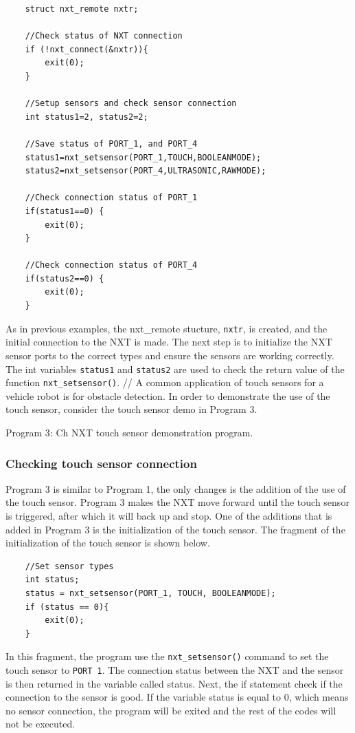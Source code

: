 \documentclass[12pt]{article}
\begin{document}
\begin{verbatim}
    struct nxt_remote nxtr;

    //Check status of NXT connection
    if (!nxt_connect(&nxtr)){
        exit(0);
    }
    
    //Setup sensors and check sensor connection
    int status1=2, status2=2;

    //Save status of PORT_1, and PORT_4
    status1=nxt_setsensor(PORT_1,TOUCH,BOOLEANMODE);
    status2=nxt_setsensor(PORT_4,ULTRASONIC,RAWMODE);
    
    //Check connection status of PORT_1
    if(status1==0) {
        exit(0);
    }
    
    //Check connection status of PORT_4
    if(status2==0) {
        exit(0);
    }
\end{verbatim}
As in previous examples, the nxt\_remote stucture, \verb+nxtr+, is created, and the initial connection 
to the NXT is made. The next step is to initialize the NXT sensor ports to the correct types and ensure 
the sensors are working correctly.  The int variables \verb+status1+ and \verb+status2+ are used to 
check the return value of the function \verb+nxt_setsensor()+.
//
A common application of touch sensors for a vehicle robot is for obstacle detection. In order to 
demonstrate the use of the touch sensor, consider the touch sensor demo in Program 3.


\begin{center}
Program 3: Ch NXT touch sensor demonstration program.
\end{center}

\subsubsection*{Checking touch sensor connection}
Program 3 is similar to Program 1, the only changes is the addition of the use of the touch sensor. Program 3 
makes the NXT move forward until the touch sensor is triggered, after which it will back up and stop. One of 
the additions that is added in Program 3 is the initialization of the touch sensor. The fragment of the 
initialization of the touch sensor is shown below.

\begin{verbatim}
    //Set sensor types
    int status;
    status = nxt_setsensor(PORT_1, TOUCH, BOOLEANMODE);
    if (status == 0){
        exit(0);
    }
\end{verbatim}
In this fragment, the program use the \verb+nxt_setsensor()+ command to set the touch sensor to \verb+PORT 1+. 
The connection status between the NXT and the sensor is then returned in the variable called status. Next, the 
if statement check if the connection to the sensor is good. If the variable status is equal to 0, which means
 no sensor connection, the program will be exited and the rest of the codes will not be executed.
    
\end{document}
